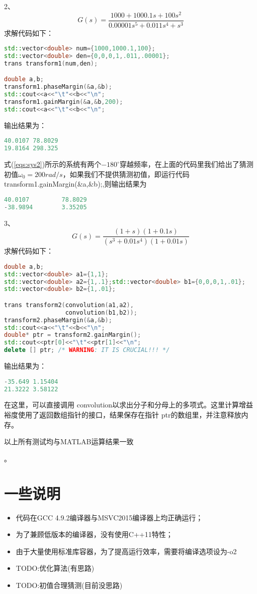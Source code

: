 \documentclass[utf8]{ctexart}
\newcommand{\code}[1]{{\fontspec{Consolas} #1}}
\begin{document}
2、\begin{equation}\label{eqs:sys2}
G(s)=\frac{1000+1000.1s+100s^2}{0.00001s^5+0.011s^4+s^3}
\end{equation}
求解代码如下：
\begin{lstlisting}[language=C++]
std::vector<double> num={1000,1000.1,100};
std::vector<double> den={0,0,0,1,.011,.00001};
trans transform1(num,den);

double a,b;
transform1.phaseMargin(&a,&b);
std::cout<<a<<"\t"<<b<<"\n";
transform1.gainMargin(&a,&b,200);
std::cout<<a<<"\t"<<b<<"\n";
\end{lstlisting}
输出结果为：
\begin{lstlisting}[language=C++]
40.0107 78.8029
19.8164 298.325
\end{lstlisting}
\par 式(\ref{eqs:sys2})所示的系统有两个$-180^\circ$穿越频率，在上面的代码里我们给出了猜测初值$\omega_0=200rad/s$，如果我们不提供猜测初值，即运行代码\code{transform1.gainMargin(\&a,\&b);},则输出结果为
\begin{lstlisting}[language=C++]
40.0107 		78.8029
-38.9894        3.35205
\end{lstlisting}
3、
\begin{equation}\label{eqs:sys3}
G(s)=\frac{(1+s)(1+0.1s)}{(s^3+0.01s^4)(1+0.01s)}
\end{equation}
求解代码如下：
\begin{lstlisting}[language=C++]
double a,b;
std::vector<double> a1={1,1};
std::vector<double> a2={1,.1};std::vector<double> b1={0,0,0,1,.01};
std::vector<double> b2={1,.01};

trans transform2(convolution(a1,a2),
                 convolution(b1,b2));
transform2.phaseMargin(&a,&b);
std::cout<<a<<"\t"<<b<<"\n";
double* ptr = transform2.gainMargin();
std::cout<<ptr[0]<<"\t"<<ptr[1]<<"\n"; 
delete [] ptr; /* WARNING: IT IS CRUCIAL!!! */
\end{lstlisting}
输出结果为：
\begin{lstlisting}[language=C++]
-35.649 1.15404
21.3222 3.58122
\end{lstlisting}
\par 在这里，可以直接调用\code{convolution}以求出分子和分母上的多项式。这里计算增益裕度使用了返回数组指针的接口，结果保存在指针\code{ptr}的数组里，并注意释放内存。\begin{bfseries}{以上所有测试均与MATLAB运算结果一致}\end{bfseries}。
\section{一些说明}
\begin{itemize}
	\item 代码在GCC 4.9.2编译器与MSVC2015编译器上均正确运行；
	\item 为了兼顾低版本的编译器，没有使用C++11特性；
	\item 由于大量使用标准库容器，为了提高运行效率，需要将编译选项设为-o2
	\item TODO:优化算法(有思路)
	\item TODO:初值合理猜测(目前没思路)
\end{itemize}
\end{document}
